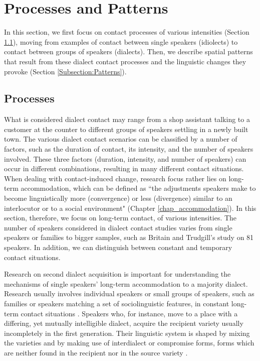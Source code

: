 \documentclass[output=paper]{langscibook}
\begin{document}
\section{Processes and Patterns}
\label{Section:P&P}

In this section, we first focus on contact processes of various intensities (Section \ref{Subsection:Processes}), moving from examples of contact between single speakers (idiolects) to contact between groups of speakers (dialects).
Then, we describe spatial patterns that result from these dialect contact processes and the linguistic changes they provoke (Section \ref{Subsection:Patterns}).


\subsection{Processes}
\label{Subsection:Processes}
What is considered dialect contact may range from a shop assistant talking to a customer at the counter to different groups of speakers settling in a newly built town. The various dialect contact scenarios can be classified by a number of factors, such as the duration of contact, its intensity, and the number of speakers involved. These three factors (duration, intensity, and number of speakers) can occur in different combinations, resulting in many different contact situations.
When dealing with contact-induced change, research focus rather lies on long-term accommodation, which can be defined as “the adjustments speakers make to become linguistically more (convergence) or less (divergence) similar to an interlocutor or to a social environment" (Chapter \ref{chap_accommodation}).
In this section, therefore, we focus on long-term contact, of various intensities. 
The number of speakers considered in dialect contact studies varies from single speakers or families \parencite[e.g.,][]{Ghimenton2013} to bigger samples, such as Britain and Trudgill's \parencite*{BritainTrudgill.2005} study on 81 speakers. In addition, we can distinguish between constant and temporary contact situations. 

Research on second dialect acquisition is important for understanding the mechanisms of single speakers' long-term accommodation to a majority dialect. Research usually involves individual speakers or small groups of speakers, such as families or speakers matching a set of sociolinguistic features, in constant long-term contact situations \parencite[22--51]{Siegel.2010}. Speakers who, for instance, move to a place with a differing, yet mutually intelligible dialect, acquire the recipient variety usually incompletely in the first generation. Their linguistic system is shaped by mixing the varieties and by making use of interdialect or compromise forms, forms which are neither found in the recipient nor in the source variety \parencite[117]{Trudgill1986,Wilson2019}.
\end{document}
